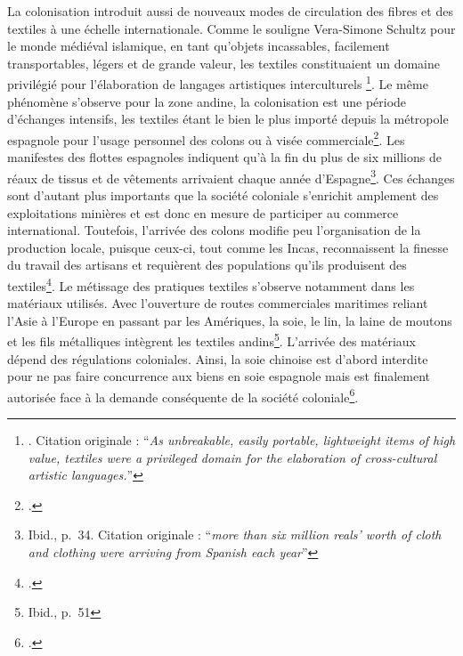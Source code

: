 La colonisation introduit aussi de nouveaux modes de circulation des fibres et des textiles à une échelle internationale. Comme le souligne Vera-Simone Schultz pour le monde médiéval islamique, \og en tant qu'objets incassables, facilement transportables, légers et de grande valeur, les textiles constituaient un domaine privilégié pour l'élaboration de langages artistiques interculturels \fg \footnote{\cite[p.~96]{schulzCrossroadsClothTextile2016}. Citation originale : \textquotedblleft \textit{As unbreakable, easily portable, lightweight items of high value, textiles were a privileged domain for the elaboration of cross-cultural artistic languages.}\textquotedblright}. Le même phénomène s'observe pour la zone andine, la colonisation est une période d'échanges intensifs, les textiles étant le bien le plus importé depuis la métropole espagnole pour l'usage personnel des colons ou à visée commerciale\footcite[p.~33]{phippsIberianGlobe2013}. Les manifestes des flottes espagnoles indiquent qu'à la fin du   \og plus de six millions de réaux de tissus et de vêtements arrivaient chaque année d'Espagne\fg\footnote{Ibid., p.~34. Citation originale : \textquotedblleft \textit{more than six million reals' worth of cloth and clothing were arriving from Spanish each year}\textquotedblright}. Ces échanges sont d'autant plus importants que la société coloniale s'enrichit amplement des exploitations minières et est donc en mesure de participer au commerce international. Toutefois, l'arrivée des colons modifie peu l'organisation de la production locale, puisque ceux-ci, tout comme les Incas, reconnaissent la finesse du travail des artisans et requièrent des populations qu'ils produisent des textiles\footcite[p.~52]{nilesArtistEmpireInca1994}. Le métissage des pratiques textiles s'observe notamment dans les matériaux utilisés. Avec l'ouverture de routes commerciales maritimes reliant l'Asie à l'Europe en passant par les Amériques, la soie, le lin, la laine de moutons et les fils métalliques intègrent les textiles andins\footnote{Ibid., p.~51}.
L'arrivée des matériaux dépend des régulations coloniales. Ainsi, la soie chinoise est d'abord interdite pour ne pas faire concurrence aux biens en soie espagnole mais est finalement autorisée face à la demande conséquente de la société coloniale\footcite[p.~34]{phippsIberianGlobe2013}. \\

